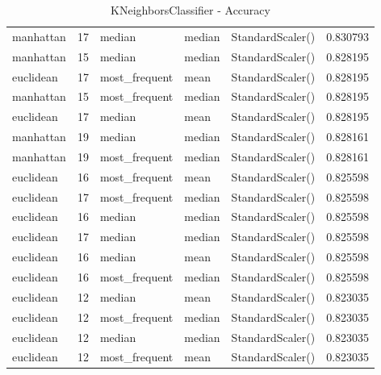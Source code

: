 \documentclass[12pt,twoside]{report}
\begin{document}
\begin{table}[ht!]
\begin{center}
{\begin{tabular}{lrlllr}
  manhattan &                17 &                          median &                          median &  StandardScaler() &  0.830793 \\
  manhattan &                15 &                          median &                          median &  StandardScaler() &  0.828195 \\
  euclidean &                17 &                   most\_frequent &                            mean &  StandardScaler() &  0.828195 \\
  manhattan &                15 &                   most\_frequent &                          median &  StandardScaler() &  0.828195 \\
  euclidean &                17 &                          median &                            mean &  StandardScaler() &  0.828195 \\
  manhattan &                19 &                          median &                          median &  StandardScaler() &  0.828161 \\
  manhattan &                19 &                   most\_frequent &                          median &  StandardScaler() &  0.828161 \\
  euclidean &                16 &                   most\_frequent &                            mean &  StandardScaler() &  0.825598 \\
  euclidean &                17 &                   most\_frequent &                          median &  StandardScaler() &  0.825598 \\
  euclidean &                16 &                          median &                          median &  StandardScaler() &  0.825598 \\
  euclidean &                17 &                          median &                          median &  StandardScaler() &  0.825598 \\
  euclidean &                16 &                          median &                            mean &  StandardScaler() &  0.825598 \\
  euclidean &                16 &                   most\_frequent &                          median &  StandardScaler() &  0.825598 \\
  euclidean &                12 &                          median &                            mean &  StandardScaler() &  0.823035 \\
  euclidean &                12 &                   most\_frequent &                          median &  StandardScaler() &  0.823035 \\
  euclidean &                12 &                          median &                          median &  StandardScaler() &  0.823035 \\
  euclidean &                12 &                   most\_frequent &                            mean &  StandardScaler() &  0.823035 \\
\bottomrule
\end{tabular}
}
\end{center}
\caption{KNeighborsClassifier - Accuracy}
\label{knn:table}
\end{table}
\end{document}
